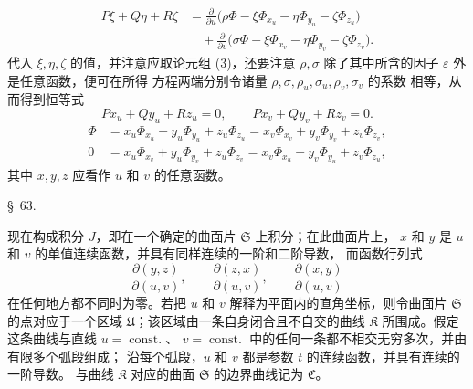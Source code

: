 \documentclass[11pt,a4paper,leqno]{article}
\begin{document}
\[
\begin{aligned}
P\xi+Q\eta+R\zeta
&=\frac{\partial}{\partial u}
\bigl(\rho\Phi-\xi\Phi_{x_u}-\eta\Phi_{y_u}-\zeta\Phi_{z_u}\bigr)\\
&\quad+\frac{\partial}{\partial v}
\bigl(\sigma\Phi-\xi\Phi_{x_v}-\eta\Phi_{y_v}-\zeta\Phi_{z_v}\bigr).
\end{aligned}
\]
代入 $\xi,\eta,\zeta$ 的值，并注意应取论元组 (3)，还要注意
$\rho,\sigma$ 除了其中所含的因子 $\varepsilon$ 外是任意函数，便可在所得
方程两端分别令诸量 $\rho,\sigma,\rho_u,\sigma_u,\rho_v,\sigma_v$ 的系数
相等，从而得到恒等式
\begin{equation}\tag{4}
Px_u+Qy_u+Rz_u=0,
\qquad
Px_v+Qy_v+Rz_v=0.
\end{equation}
\begin{equation}\tag{5}
\begin{aligned}
\Phi
&=x_u\Phi_{x_u}+y_u\Phi_{y_u}+z_u\Phi_{z_u}
=x_v\Phi_{x_v}+y_v\Phi_{y_v}+z_v\Phi_{z_v},\\
0
&=x_u\Phi_{x_v}+y_u\Phi_{y_v}+z_u\Phi_{z_v}
=x_v\Phi_{x_u}+y_v\Phi_{y_u}+z_v\Phi_{z_u},
\end{aligned}
\end{equation}
其中 $x,y,z$ 应看作 $u$ 和 $v$ 的任意函数。

\begin{center}
{\large \S~63.}
\end{center}

现在构成积分 $J$，即在一个确定的曲面片 $\mathfrak{S}$ 上积分；在此曲面片上，
$x$ 和 $y$ 是 $u$ 和 $v$ 的单值连续函数，并具有同样连续的一阶和二阶导数，
而函数行列式
\begin{equation}\tag{6}
\frac{\partial(y,z)}{\partial(u,v)},\qquad
\frac{\partial(z,x)}{\partial(u,v)},\qquad
\frac{\partial(x,y)}{\partial(u,v)}
\end{equation}
在任何地方都不同时为零。若把 $u$ 和 $v$ 解释为平面内的直角坐标，则令曲面片
$\mathfrak{S}$ 的点对应于一个区域 $\mathfrak{U}$；该区域由一条自身闭合且不自交的曲线
$\mathfrak{K}$ 所围成。假定这条曲线与直线 $u=\operatorname{const.}$、
$v=\operatorname{const.}$ 中的任何一条都不相交无穷多次，并由有限多个弧段组成；
沿每个弧段，$u$ 和 $v$ 都是参数 $t$ 的连续函数，并具有连续的一阶导数。
与曲线 $\mathfrak{K}$ 对应的曲面 $\mathfrak{S}$ 的边界曲线记为 $\mathfrak{C}$。
\end{document}
